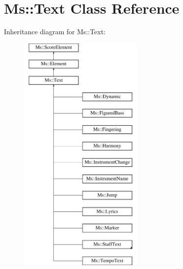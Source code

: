 \hypertarget{class_ms_1_1_text}{}\section{Ms\+:\+:Text Class Reference}
\label{class_ms_1_1_text}
Inheritance diagram for Ms\+:\+:Text\+:\begin{figure}[H]
\begin{center}
\leavevmode
\includegraphics[height=12.000000cm]{class_ms_1_1_text}
\end{center}
\end{figure}
